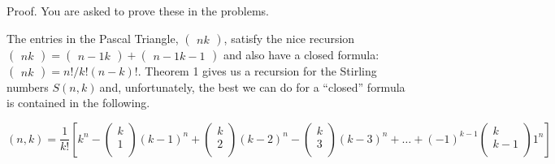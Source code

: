 \documentclass[10pt,letter]{article}
\begin{document}
Proof. You are asked to prove these in the problems.

The entries in the Pascal Triangle, \(\begin{pmatrix}
n
k
\end{pmatrix}
\), satisfy the nice recursion \(\begin{pmatrix}
n
k
\end{pmatrix}
 =
\begin{pmatrix}
n - 1
k
\end{pmatrix}
 +\begin{pmatrix}
n - 1
k - 1
\end{pmatrix}
\) and also have a closed formula: \(\begin{pmatrix}
n
k
\end{pmatrix}
 = n!/k!\left( n - k \right)!\). Theorem 1 gives us a
recursion for the Stirling numbers \(S\left( n,k \right)\ \)and,
unfortunately, the best we can do for a ``closed'' formula is contained
in the following.

\[
\left( n,k \right) = \frac{1}{k!}\left\lbrack k^{n} - \begin{pmatrix}
k \\
1 \\
\end{pmatrix}\left( k - 1 \right)^{n} + \begin{pmatrix}
k \\
2 \\
\end{pmatrix}\left( k - 2 \right)^{n} - \begin{pmatrix}
k \\
3 \\
\end{pmatrix}\left( k - 3 \right)^{n} + \ldots + \left( - 1 \right)^{k - 1}\begin{pmatrix}
k \\
k - 1 \\
\end{pmatrix}1^{n} \right\rbrack
\]
\end{document}
